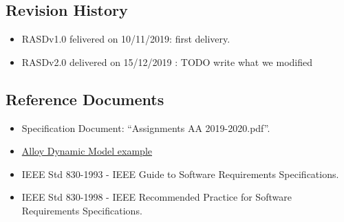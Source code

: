 \subsection {Revision History}
\begin{itemize}
\item      RASDv1.0 felivered on 10/11/2019: first delivery.
\item	RASDv2.0 delivered on 15/12/2019 : TODO write what we modified
\end{itemize}
\subsection {Reference Documents}
\begin{itemize}
\item	Specification Document: “Assignments AA 2019-2020.pdf”.
\item	\href{http://homepage.cs.uiowa.edu/~tinelli/classes/181/Spring10/Notes/09-dynamic-models.pdf }{Alloy Dynamic Model example} 
\item	IEEE Std 830-1993 - IEEE Guide to Software Requirements Specifications.
\item	IEEE Std 830-1998 - IEEE Recommended Practice for Software Requirements Specifications.

\end{itemize}
